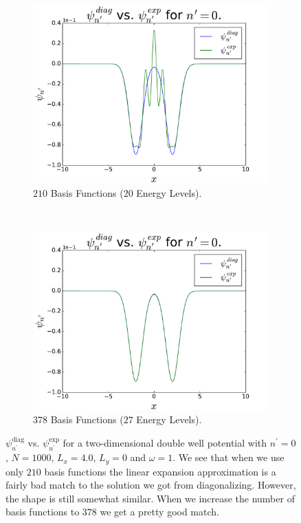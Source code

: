 \documentclass[../main.tex]{subfiles}
\begin{document}
\begin{figure}
    \centering
    \begin{subfigure}{0.5\textwidth}
        \centering
        \includegraphics[scale=0.4]{figures/psiComp/psiComp_nPrime0_BF210}
        \caption{$210$ Basis Functions ($20$ Energy Levels).}
        \label{fig:nPrime0a}
    \end{subfigure}%
    ~ 
    \begin{subfigure}{0.5\textwidth}
        \centering
        \includegraphics[scale=0.4]{figures/psiComp/psiComp_nPrime0_BF378}
        \caption{$378$ Basis Functions ($27$ Energy Levels).}
        \label{fig:nPrime0b}
    \end{subfigure}
    \caption{$\psi_{n^\prime}^\textrm{diag}$ vs. $\psi_{n^\prime}^\textrm{exp}$ for a two-dimensional double well potential with $n^\prime = 0$, $N=1000$, $L_x = 4.0$, $L_y = 0$ and $\omega = 1$. We see that when we use only $210$ basis functions the linear expansion approximation is a fairly bad match to the solution we got from diagonalizing. However, the shape is still somewhat similar. When we increase the number of basis functions to $378$ we get a pretty good match.}
    \label{fig:nPrime0}
\end{figure}
\end{document}

